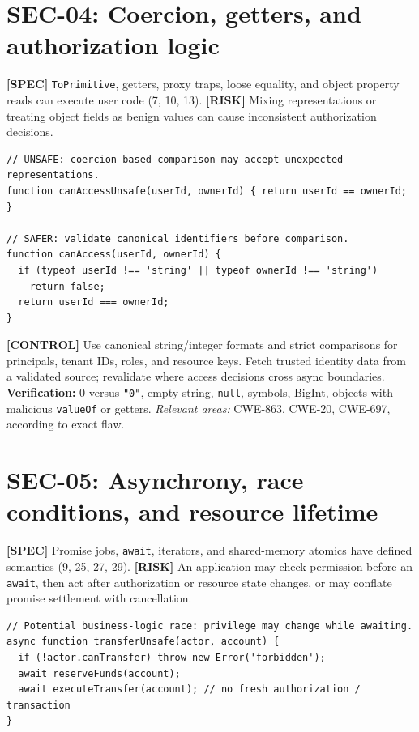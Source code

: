 \documentclass[11pt,letterpaper]{article}
\newcommand{\passthrough}[1]{#1}
\begin{document}
\section{SEC-04: Coercion, getters, and authorization logic}\label{sec-04-coercion-getters-and-authorization-logic}

\textbf{{[}SPEC{]}} \passthrough{\lstinline!ToPrimitive!}, getters, proxy traps, loose equality, and object property reads can execute user code (7, 10, 13). \textbf{{[}RISK{]}} Mixing representations or treating object fields as benign values can cause inconsistent authorization decisions.

\begin{lstlisting}
// UNSAFE: coercion-based comparison may accept unexpected representations.
function canAccessUnsafe(userId, ownerId) { return userId == ownerId; }

// SAFER: validate canonical identifiers before comparison.
function canAccess(userId, ownerId) {
  if (typeof userId !== 'string' || typeof ownerId !== 'string')
    return false;
  return userId === ownerId;
}
\end{lstlisting}

\textbf{{[}CONTROL{]}} Use canonical string/integer formats and strict comparisons for principals, tenant IDs, roles, and resource keys. Fetch trusted identity data from a validated source; revalidate where access decisions cross async boundaries. \textbf{Verification:} 0 versus \passthrough{\lstinline!"0"!}, empty string, \passthrough{\lstinline!null!}, symbols, BigInt, objects with malicious \passthrough{\lstinline!valueOf!} or getters. \emph{Relevant areas:} CWE-863, CWE-20, CWE-697, according to exact flaw.

\section{SEC-05: Asynchrony, race conditions, and resource lifetime}\label{sec-05-asynchrony-race-conditions-and-resource-lifetime}

\textbf{{[}SPEC{]}} Promise jobs, \passthrough{\lstinline!await!}, iterators, and shared-memory atomics have defined semantics (9, 25, 27, 29). \textbf{{[}RISK{]}} An application may check permission before an \passthrough{\lstinline!await!}, then act after authorization or resource state changes, or may conflate promise settlement with cancellation.

\begin{lstlisting}
// Potential business-logic race: privilege may change while awaiting.
async function transferUnsafe(actor, account) {
  if (!actor.canTransfer) throw new Error('forbidden');
  await reserveFunds(account);
  await executeTransfer(account); // no fresh authorization / transaction
}
\end{lstlisting}
\end{document}
